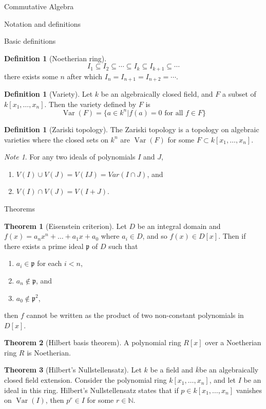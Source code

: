 \documentclass{article}
\theoremstyle{definition}
\newtheorem{theorem}{Theorem}
\numberwithin{theorem}{subsection} %
\theoremstyle{remark}
\newtheorem*{remark}{Note}
\theoremstyle{definition}
\newtheorem{definition}[paragraph]{Definition}
\newcommand{\Var}{\operatorname{Var}}
\newcommand{\N}{\mathbb N}
\newcommand{\set}[1]{\{#1\}}
\begin{document}
\begin{section}{Commutative Algebra}
\begin{subsection}{Notation and definitions}
\begin{subsubsection}{Basic definitions}
\begin{definition}[Noetherian ring]
\[          I_1 \subseteq I_2 \subseteq \cdots \subseteq I_k \subseteq I_{k+1} \subseteq \cdots
        \] there exists some $n$ after which $I_n = I_{n+1} = I_{n+2} = \cdots$.
      \end{definition}
      \begin{definition}[Variety]
        Let $k$ be an algebraically closed field, and $F$ a subset of $k[x_1, \hdots, x_n]$.
        Then the variety defined by $F$ is \[
          \Var(F) = \set{a \in k^n | f(a) = 0 \text{ for all } f \in F}
        \]
      \end{definition}
      \begin{definition}[Zariski topology]
        The Zariski topology is a topology on algebraic varieties where the
        closed sets on $k^n$ are $\Var(F)$ for some $F \subset k[x_1, \hdots, x_n]$.
      \end{definition}
      \begin{remark}
        For any two ideals of polynomials $I$ and $J$, \begin{enumerate}
          \item $V(I) \cup V(J) = V(IJ) = Var(I \cap J)$, and
          \item $V(I) \cap V(J) = V(I + J)$.
        \end{enumerate}
      \end{remark}
    \end{subsubsection}
  \end{subsection}
  \begin{subsection}{Theorems}
    \begin{theorem}[Eisenstein criterion]
      Let $D$ be an integral domain and $f(x) = a_nx^n + \hdots + a_1x + a_0$
      where $a_i \in D$, and so $f(x) \in D[x]$. Then if there exists a prime
      ideal $\mathfrak p$ of $D$ such that \begin{enumerate}
        \item $a_i \in \mathfrak p$ for each $i < n$,
        \item $a_n \not\in \mathfrak p$, and
        \item $a_0 \not\in \mathfrak p^2$,
      \end{enumerate} then $f$ cannot be written as the product of two
      non-constant polynomials in $D[x]$.
    \end{theorem}
    \begin{theorem}[Hilbert basis theorem]
      A polynomial ring $R[x]$ over a Noetherian ring $R$ is Noetherian.
    \end{theorem}
    \begin{theorem}[Hilbert's Nullstellensatz]
      Let $k$ be a field and $\overline k$be an algebraically closed field
      extension. Consider the polynomial ring $k[x_1, \hdots, x_n]$, and let
      $I$ be an ideal in this ring.
      Hilbert's Nullstellensatz states that if $p \in k[x_1, \hdots, x_n]$
      vanishes on $\Var(I)$, then $p^r \in I$ for some $r \in \N$.
    \end{theorem}
  \end{subsection}
\end{section}
\end{document}
